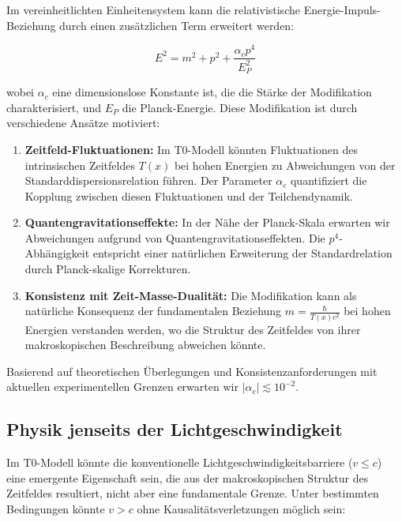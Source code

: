 \documentclass[12pt,a4paper]{article}
\newcommand{\Tfield}{T(x)}
\begin{document}
	Im vereinheitlichten Einheitensystem kann die relativistische Energie-Impuls-Beziehung durch einen zusätzlichen Term erweitert werden:
	
	\begin{equation}
		E^2 = m^2 + p^2 + \frac{\alpha_c p^4}{E_P^2}
	\end{equation}
	
	wobei \(\alpha_c\) eine dimensionslose Konstante ist, die die Stärke der Modifikation charakterisiert, und \(E_P\) die Planck-Energie. Diese Modifikation ist durch verschiedene Ansätze motiviert:
	
	\begin{enumerate}
		\item \textbf{Zeitfeld-Fluktuationen:} Im T0-Modell könnten Fluktuationen des intrinsischen Zeitfeldes \(\Tfield\) bei hohen Energien zu Abweichungen von der Standarddispersionsrelation führen. Der Parameter \(\alpha_c\) quantifiziert die Kopplung zwischen diesen Fluktuationen und der Teilchendynamik.
		\item \textbf{Quantengravitationseffekte:} In der Nähe der Planck-Skala erwarten wir Abweichungen aufgrund von Quantengravitationseffekten. Die \(p^4\)-Abhängigkeit entspricht einer natürlichen Erweiterung der Standardrelation durch Planck-skalige Korrekturen.
		\item \textbf{Konsistenz mit Zeit-Masse-Dualität:} Die Modifikation kann als natürliche Konsequenz der fundamentalen Beziehung \(m = \frac{\hbar}{\Tfield c^2}\) bei hohen Energien verstanden werden, wo die Struktur des Zeitfeldes von ihrer makroskopischen Beschreibung abweichen könnte.
	\end{enumerate}
	
	Basierend auf theoretischen Überlegungen und Konsistenzanforderungen mit aktuellen experimentellen Grenzen erwarten wir \(|\alpha_c| \lesssim 10^{-2}\).
	
	\subsection{Physik jenseits der Lichtgeschwindigkeit}
	
	Im T0-Modell könnte die konventionelle Lichtgeschwindigkeitsbarriere (\(v \leq c\)) eine emergente Eigenschaft sein, die aus der makroskopischen Struktur des Zeitfeldes resultiert, nicht aber eine fundamentale Grenze. Unter bestimmten Bedingungen könnte \(v > c\) ohne Kausalitätsverletzungen möglich sein:
	
\end{document}
